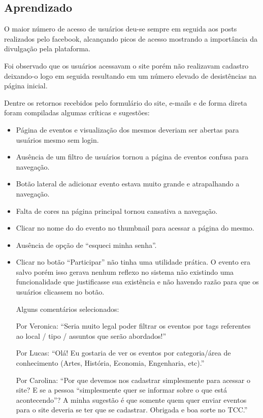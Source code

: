 \subsection{Aprendizado}
\par O maior número de acesso de usuários deu-se sempre em seguida aos posts realizados pelo facebook, alcançando picos de acesso mostrando a importância da divulgação pela plataforma.
\par Foi observado que os usuários acessavam o site porém não realizavam cadastro deixando-o logo em seguida resultando em um número elevado de desistências na página inicial.
\par Dentre os retornos recebidos pelo formulário do site, e-mails e de forma direta foram compiladas algumas críticas e sugestões:
\begin{itemize}
\item Página de eventos e visualização dos mesmos deveriam ser abertas para usuários mesmo sem login.
\item Ausência de um filtro de usuários tornou a página de eventos confusa para navegação.
\item Botão lateral de adicionar evento estava muito grande e atrapalhando a navegação.
\item Falta de cores na página principal tornou cansativa a navegação.
\item Clicar no nome do do evento no thumbnail para acessar a página do mesmo.
\item Ausência de opção de ``esqueci minha senha''.
\item Clicar no botão ``Participar'' não tinha uma utilidade prática. O evento era salvo porém isso gerava nenhum reflexo no sistema não existindo uma funcionalidade que justificasse sua existência e não havendo razão para que os usuários clicassem no botão.
\par Alguns comentários selecionados:

\par Por Veronica: ``Seria muito legal poder filtrar os eventos por tags referentes ao local / tipo / assuntos que serão abordados!''

\par Por Lucas: ``Olá! Eu gostaria de ver os eventos por categoria/área de conhecimento (Artes, História, Economia, Engenharia, etc).''

\par Por Carolina: ``Por que devemos nos cadastrar simplesmente para acessar o site? E se a pessoa ``simplesmente quer se informar sobre o que está acontecendo''? A minha sugestão é que somente quem quer enviar eventos para o site deveria se ter que se cadastrar. Obrigada e boa sorte no TCC.''


\end{itemize}
